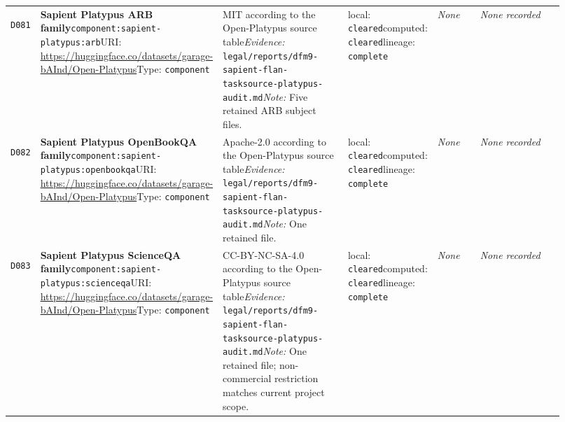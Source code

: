 \documentclass[9pt,a4paper]{article}
\newcommand{\depid}[1]{\hypertarget{dep:#1}{\texttt{#1}}}
\begin{document}
\begin{landscape}
\begin{longtable}{@{}L{0.035\linewidth}L{0.185\linewidth}L{0.27\linewidth}L{0.09\linewidth}L{0.10\linewidth}L{0.24\linewidth}@{}}
\depid{D081} & \textbf{Sapient Platypus ARB family}\newline \nolinkurl{component:sapient-platypus:arb}\newline URI: \url{https://huggingface.co/datasets/garage-bAInd/Open-Platypus}\newline Type: \texttt{component} & MIT according to the Open-Platypus source table\newline \textit{Evidence:} \nolinkurl{legal/reports/dfm9-sapient-flan-tasksource-platypus-audit.md}\newline \textit{Note:} Five retained ARB subject files. & local: \texttt{cleared}\newline computed: \texttt{cleared}\newline lineage: \texttt{complete} & \textit{None} & \textit{None recorded} \\
\depid{D082} & \textbf{Sapient Platypus OpenBookQA family}\newline \nolinkurl{component:sapient-platypus:openbookqa}\newline URI: \url{https://huggingface.co/datasets/garage-bAInd/Open-Platypus}\newline Type: \texttt{component} & Apache-2.0 according to the Open-Platypus source table\newline \textit{Evidence:} \nolinkurl{legal/reports/dfm9-sapient-flan-tasksource-platypus-audit.md}\newline \textit{Note:} One retained file. & local: \texttt{cleared}\newline computed: \texttt{cleared}\newline lineage: \texttt{complete} & \textit{None} & \textit{None recorded} \\
\depid{D083} & \textbf{Sapient Platypus ScienceQA family}\newline \nolinkurl{component:sapient-platypus:scienceqa}\newline URI: \url{https://huggingface.co/datasets/garage-bAInd/Open-Platypus}\newline Type: \texttt{component} & CC-BY-NC-SA-4.0 according to the Open-Platypus source table\newline \textit{Evidence:} \nolinkurl{legal/reports/dfm9-sapient-flan-tasksource-platypus-audit.md}\newline \textit{Note:} One retained file; non-commercial restriction matches current project scope. & local: \texttt{cleared}\newline computed: \texttt{cleared}\newline lineage: \texttt{complete} & \textit{None} & \textit{None recorded} \\

\end{longtable}
\end{landscape}
\end{document}
